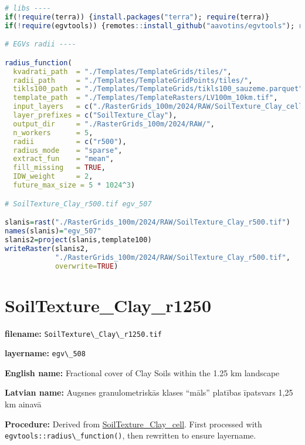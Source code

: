 \documentclass[
]{book}
\newcommand{\passthrough}[1]{#1}
\begin{document}
\begin{lstlisting}[language=R]
# libs ----
if(!require(terra)) {install.packages("terra"); require(terra)}
if(!require(egvtools)) {remotes::install_github("aavotins/egvtools"); require(egvtools)}

# EGVs radii ----

radius_function(
  kvadrati_path  = "./Templates/TemplateGrids/tiles/",
  radii_path     = "./Templates/TemplateGridPoints/tiles/",
  tikls100_path  = "./Templates/TemplateGrids/tikls100_sauzeme.parquet",
  template_path  = "./Templates/TemplateRasters/LV100m_10km.tif",
  input_layers   = c("./RasterGrids_100m/2024/RAW/SoilTexture_Clay_cell.tif"),
  layer_prefixes = c("SoilTexture_Clay"),
  output_dir     = "./RasterGrids_100m/2024/RAW/",
  n_workers      = 5,
  radii          = c("r500"),
  radius_mode    = "sparse",
  extract_fun    = "mean",
  fill_missing   = TRUE,
  IDW_weight     = 2,
  future_max_size = 5 * 1024^3)

# SoilTexture_Clay_r500.tif egv_507

slanis=rast("./RasterGrids_100m/2024/RAW/SoilTexture_Clay_r500.tif")
names(slanis)="egv_507"
slanis2=project(slanis,template100)
writeRaster(slanis2,
            "./RasterGrids_100m/2024/RAW/SoilTexture_Clay_r500.tif",
            overwrite=TRUE)
\end{lstlisting}

\section{SoilTexture\_Clay\_r1250}\label{ch06.508}

\textbf{filename:} \passthrough{\lstinline!SoilTexture\_Clay\_r1250.tif!}

\textbf{layername:} \passthrough{\lstinline!egv\_508!}

\textbf{English name:} Fractional cover of Clay Soils within the 1.25 km landscape

\textbf{Latvian name:} Augsnes granulometriskās klases ``māls'' platības īpatsvars 1,25 km ainavā

\textbf{Procedure:} Derived from \hyperref[ch06.506]{SoilTexture\_Clay\_cell}. First processed
with \passthrough{\lstinline!egvtools::radius\_function()!}, then rewritten to ensure layername.
\end{document}

